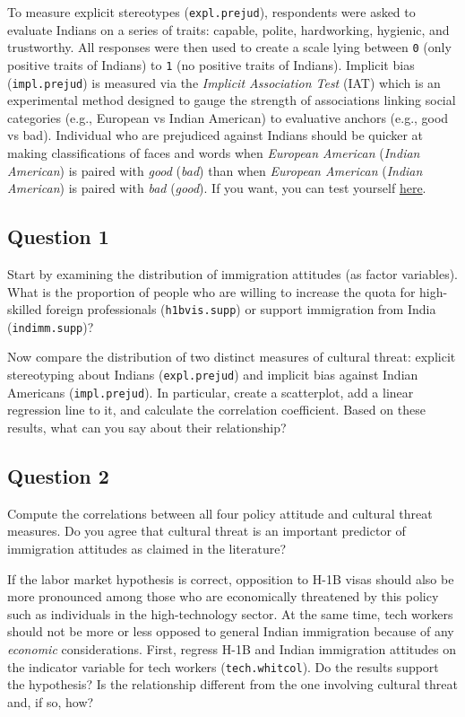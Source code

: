 \documentclass[]{article}
\begin{document}
To measure explicit stereotypes (\texttt{expl.prejud}), respondents were
asked to evaluate Indians on a series of traits: capable, polite,
hardworking, hygienic, and trustworthy. All responses were then used to
create a scale lying between \texttt{0} (only positive traits of
Indians) to \texttt{1} (no positive traits of Indians). Implicit bias
(\texttt{impl.prejud}) is measured via the \emph{Implicit Association
Test} (IAT) which is an experimental method designed to gauge the
strength of associations linking social categories (e.g., European vs
Indian American) to evaluative anchors (e.g., good vs bad). Individual
who are prejudiced against Indians should be quicker at making
classifications of faces and words when \emph{European American}
(\emph{Indian American}) is paired with \emph{good} (\emph{bad}) than
when \emph{European American} (\emph{Indian American}) is paired with
\emph{bad} (\emph{good}). If you want, you can test yourself
\href{https://implicit.harvard.edu/implicit/takeatest.html}{here}.

\subsection{Question 1}\label{question-1}

Start by examining the distribution of immigration attitudes (as factor
variables). What is the proportion of people who are willing to increase
the quota for high-skilled foreign professionals (\texttt{h1bvis.supp})
or support immigration from India (\texttt{indimm.supp})?

Now compare the distribution of two distinct measures of cultural
threat: explicit stereotyping about Indians (\texttt{expl.prejud}) and
implicit bias against Indian Americans (\texttt{impl.prejud}). In
particular, create a scatterplot, add a linear regression line to it,
and calculate the correlation coefficient. Based on these results, what
can you say about their relationship?

\subsection{Question 2}\label{question-2}

Compute the correlations between all four policy attitude and cultural
threat measures. Do you agree that cultural threat is an important
predictor of immigration attitudes as claimed in the literature?

If the labor market hypothesis is correct, opposition to H-1B visas
should also be more pronounced among those who are economically
threatened by this policy such as individuals in the high-technology
sector. At the same time, tech workers should not be more or less
opposed to general Indian immigration because of any \emph{economic}
considerations. First, regress H-1B and Indian immigration attitudes on
the indicator variable for tech workers (\texttt{tech.whitcol}). Do the
results support the hypothesis? Is the relationship different from the
one involving cultural threat and, if so, how?
\end{document}

